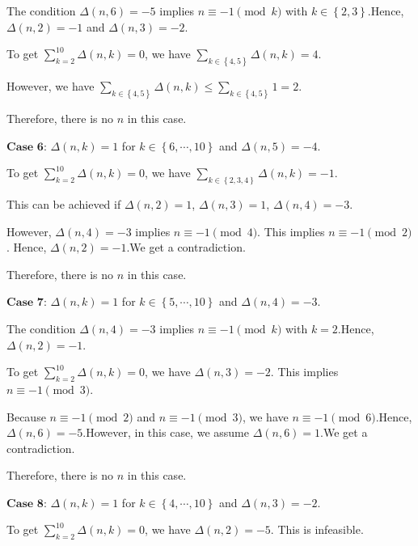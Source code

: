 \begin{enumerate}
 The condition $\Delta \left( n, 6 \right) = -5$ implies $n \equiv - 1 \pmod{k}$ with $k \in \left\{ 2, 3 \right\}$.Hence, $\Delta \left( n, 2 \right) = -1$ and $\Delta \left( n, 3 \right) = -2$.

 To get $\sum_{k = 2}^{10} \Delta \left( n, k \right) = 0$, we have $\sum_{k \in \left\{ 4, 5 \right\}} \Delta \left( n, k \right) = 4$.

 However, we have $\sum_{k \in \left\{ 4, 5 \right\}} \Delta \left( n, k \right) \leq \sum_{k \in \left\{ 4, 5 \right\}}  1 = 2$.

 Therefore, there is no $n$ in this case.

 
$\textbf{Case 6}$: $\Delta \left( n, k \right) = 1$ for $k \in \left\{ 6 , \cdots , 10 \right\}$ and $\Delta \left( n, 5 \right) = -4$.

 To get $\sum_{k = 2}^{10} \Delta \left( n, k \right) = 0$, we have $\sum_{k \in \left\{ 2, 3, 4 \right\}} \Delta \left( n, k \right) = -1$.

 This can be achieved if $\Delta \left( n, 2 \right) = 1$, $\Delta \left( n, 3 \right) = 1$, $\Delta \left( n, 4 \right) = -3$.

 However, $\Delta \left( n, 4 \right) = -3$ implies $n \equiv - 1 \pmod{4}$. This implies $n \equiv -1 \pmod{2}$. Hence, $\Delta \left( n, 2 \right) = -1$.We get a contradiction.

 Therefore, there is no $n$ in this case.

 $\textbf{Case 7}$: $\Delta \left( n, k \right) = 1$ for $k \in \left\{ 5 , \cdots , 10 \right\}$ and $\Delta \left( n, 4 \right) = -3$.

 The condition $\Delta \left( n, 4 \right) = -3$ implies $n \equiv - 1 \pmod{k}$ with $k = 2$.Hence, $\Delta \left( n, 2 \right) = -1$.

 To get $\sum_{k = 2}^{10} \Delta \left( n, k \right) = 0$, we have $\Delta \left( n, 3 \right) = - 2$. This implies $n \equiv - 1 \pmod{3}$.

 Because $n \equiv - 1 \pmod{2}$ and $n \equiv - 1 \pmod{3}$, we have $n \equiv - 1 \pmod{6}$.Hence, $\Delta \left( n, 6 \right) = - 5$.However, in this case, we assume $\Delta \left( n, 6 \right) = 1$.We get a contradiction.

 Therefore, there is no $n$ in this case.

 $\textbf{Case 8}$: $\Delta \left( n, k \right) = 1$ for $k \in \left\{ 4 , \cdots , 10 \right\}$ and $\Delta \left( n, 3 \right) = -2$.

 To get $\sum_{k = 2}^{10} \Delta \left( n, k \right) = 0$, we have $\Delta \left( n, 2 \right) = - 5$. This is infeasible.


\end{enumerate}
